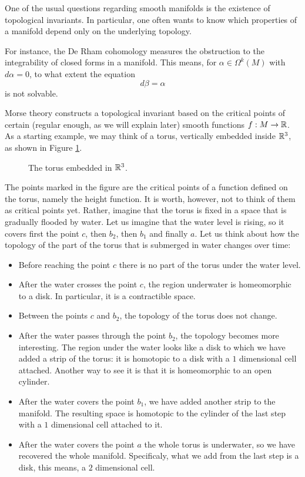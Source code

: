 One of the usual questions regarding smooth manifolds is the existence of topological invariants. In particular, one often wants to know which properties of a manifold depend only on the underlying topology.

For instance, the De Rham cohomology measures the obstruction to the integrability of closed forms in a manifold. This means, for $\alpha \in \Omega^k(M)$ with $d\alpha = 0$, to what extent the equation
\[d\beta = \alpha\]
is not solvable.

Morse theory constructs a topological invariant based on the critical points of certain (regular enough, as we will explain later) smooth functions $f : M \rightarrow \mathbb{R}$. As a starting example, we may think of a torus, vertically embedded inside $\mathbb{R}^3$, as shown in Figure \ref{figure:torus}.

\begin{figure}[h]
	\centering
	
	\caption{The torus embedded in $\mathbb{R}^3$.}
	\label{figure:torus}
\end{figure}

The points marked in the figure are the critical points of a function defined on the torus, namely the height function. It is worth, however, not to think of them as critical points yet. Rather, imagine that the torus is fixed in a space that is gradually flooded by water. Let us imagine that the water level is rising, so it covers first the point $c$, then $b_2$, then $b_1$ and finally $a$. Let us think about how the topology of the part of the torus that is submerged in water changes over time:

\begin{itemize}
	\item Before reaching the point $c$ there is no part of the torus under the water level.
	\item After the water crosses the point $c$, the region underwater is homeomorphic to a disk. In particular, it is a contractible space.
	\item Between the points $c$ and $b_2$, the topology of the torus does not change.
	\item After the water passes through the point $b_2$, the topology becomes more interesting. The region under the water looks like a disk to which we have added a strip of the torus: it is homotopic to a disk with a $1$ dimensional cell attached. Another way to see it is that it is homeomorphic to an open cylinder.
	\item After the water covers the point $b_1$, we have added another strip to the manifold. The resulting space is homotopic to the cylinder of the last step with a $1$ dimensional cell attached to it.
	\item After the water covers the point $a$ the whole torus is underwater, so we have recovered the whole manifold. Specificaly, what we add from the last step is a disk, this means, a $2$ dimensional cell.
\end{itemize}

